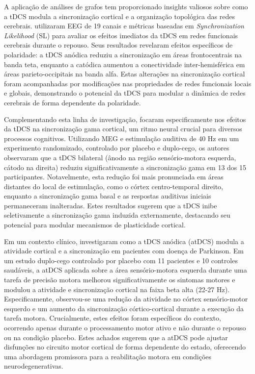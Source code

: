 A aplicação de análises de grafos tem proporcionado insights valiosos sobre como a tDCS modula a sincronização cortical e a organização topológica das redes cerebrais.  utilizaram EEG de 19 canais e métricas baseadas em \textit{Synchronization Likelihood} (SL) para avaliar os efeitos imediatos da tDCS em redes funcionais cerebrais durante o repouso. Seus resultados revelaram efeitos específicos de polaridade: a tDCS anódica reduziu a sincronização em áreas frontocentrais na banda teta, enquanto a catódica aumentou a conectividade inter-hemisférica em áreas parieto-occipitais na banda alfa. Estas alterações na sincronização cortical foram acompanhadas por modificações nas propriedades de redes funcionais locais e globais, demonstrando o potencial da tDCS para modular a dinâmica de redes cerebrais de forma dependente da polaridade.

Complementando esta linha de investigação,  focaram especificamente nos efeitos da tDCS na sincronização gama cortical, um ritmo neural crucial para diversos processos cognitivos. Utilizando MEG e estimulação auditiva de 40 Hz em um experimento randomizado, controlado por placebo e duplo-cego, os autores observaram que a tDCS bilateral (ânodo na região sensório-motora esquerda, cátodo na direita) reduziu significativamente a sincronização gama em 13 dos 15 participantes. Notavelmente, esta redução foi mais pronunciada em áreas distantes do local de estimulação, como o córtex centro-temporal direito, enquanto a sincronização gama basal e as respostas auditivas iniciais permaneceram inalteradas. Estes resultados sugerem que a tDCS inibe seletivamente a sincronização gama induzida externamente, destacando seu potencial para modular mecanismos de plasticidade cortical.

Em um contexto clínico,  investigaram como a tDCS anódica (atDCS) modula a atividade cortical e a sincronização em pacientes com doença de Parkinson. Em um estudo duplo-cego controlado por placebo com 11 pacientes e 10 controles saudáveis, a atDCS aplicada sobre a área sensório-motora esquerda durante uma tarefa de precisão motora melhorou significativamente os sintomas motores e modulou a atividade e sincronização cortical na faixa beta alta (22-27 Hz). Especificamente, observou-se uma redução da atividade no córtex sensório-motor esquerdo e um aumento da sincronização córtico-cortical durante a execução da tarefa motora. Crucialmente, estes efeitos foram específicos do contexto, ocorrendo apenas durante o processamento motor ativo e não durante o repouso ou na condição placebo. Estes achados sugerem que a atDCS pode ajustar disfunções no circuito motor cortical de forma dependente do estado, oferecendo uma abordagem promissora para a reabilitação motora em condições neurodegenerativas.

